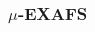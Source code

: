 \documentclass[10pt, xcolor=x11names, compress, handout]{beamer}
\begin{document}
\begin{frame}
  \frametitle{$\mu$-EXAFS}

  \begin{columns}[T]
    \begin{column}{0.34\linewidth}



\end{column}
\end{columns}
\end{frame}
\end{document}
